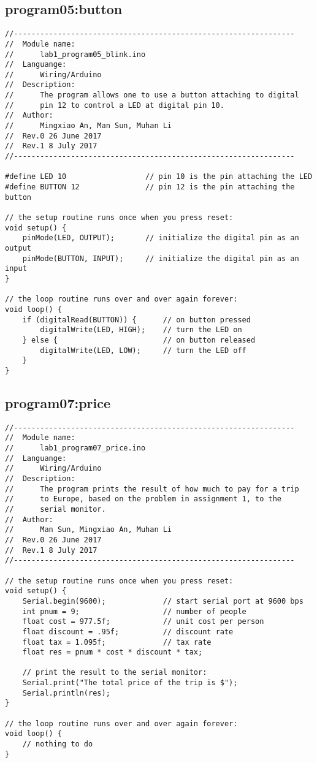 \subsection{program05:button}
\begin{verbatim}
//----------------------------------------------------------------
//  Module name:
//      lab1_program05_blink.ino
//  Languange:
//      Wiring/Arduino
//  Description:
//      The program allows one to use a button attaching to digital
//		pin 12 to control a LED at digital pin 10.
//  Author:
//      Mingxiao An, Man Sun, Muhan Li
//  Rev.0 26 June 2017
//  Rev.1 8 July 2017
//----------------------------------------------------------------

#define LED 10                  // pin 10 is the pin attaching the LED
#define BUTTON 12               // pin 12 is the pin attaching the button

// the setup routine runs once when you press reset:
void setup() {
    pinMode(LED, OUTPUT);       // initialize the digital pin as an output
    pinMode(BUTTON, INPUT);     // initialize the digital pin as an input
}

// the loop routine runs over and over again forever:
void loop() {
    if (digitalRead(BUTTON)) {      // on button pressed
        digitalWrite(LED, HIGH);    // turn the LED on
    } else {                        // on button released
        digitalWrite(LED, LOW);     // turn the LED off
    }
}
\end{verbatim}

\subsection{program07:price}
\begin{verbatim}
//----------------------------------------------------------------
//  Module name:
//      lab1_program07_price.ino
//  Languange:
//      Wiring/Arduino
//  Description:
//      The program prints the result of how much to pay for a trip
//      to Europe, based on the problem in assignment 1, to the 
//      serial monitor.
//  Author:
//      Man Sun, Mingxiao An, Muhan Li
//  Rev.0 26 June 2017
//  Rev.1 8 July 2017
//----------------------------------------------------------------

// the setup routine runs once when you press reset:
void setup() {
    Serial.begin(9600);             // start serial port at 9600 bps
    int pnum = 9;                   // number of people
    float cost = 977.5f;            // unit cost per person
    float discount = .95f;          // discount rate
    float tax = 1.095f;             // tax rate
    float res = pnum * cost * discount * tax;

    // print the result to the serial monitor:
    Serial.print("The total price of the trip is $");
    Serial.println(res);
}

// the loop routine runs over and over again forever:
void loop() {
    // nothing to do
}
\end{verbatim}


